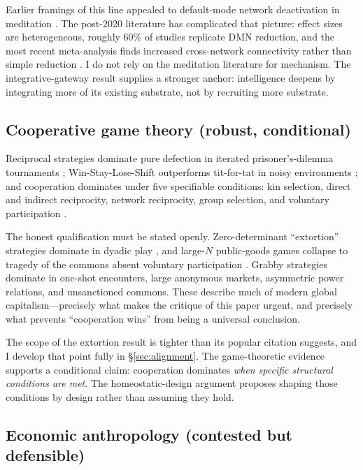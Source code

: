 \documentclass[11pt,a4paper,twocolumn]{article}
\begin{document}
Earlier framings of this line appealed to default-mode network
deactivation in meditation \citep{brewer2011,garrison2015}. The
post-2020 literature has complicated that picture: effect sizes are
heterogeneous, roughly 60\% of studies replicate DMN reduction, and
the most recent meta-analysis finds increased cross-network
connectivity rather than simple reduction
\citep{vandam2018,rahrig2022,ganesan2022}. I do not rely on the
meditation literature for mechanism. The integrative-gateway result
supplies a stronger anchor: intelligence deepens by integrating more
of its existing substrate, not by recruiting more substrate.

\subsection{Cooperative game theory (robust, conditional)}

Reciprocal strategies dominate pure defection in iterated
prisoner's-dilemma tournaments \citep{axelrod1984}; Win-Stay-Lose-Shift
outperforms tit-for-tat in noisy environments \citep{nowak1993}; and
cooperation dominates under five specifiable conditions: kin
selection, direct and indirect reciprocity, network reciprocity, group
selection, and voluntary participation \citep{nowak2006}.

The honest qualification must be stated openly. Zero-determinant
``extortion'' strategies dominate in dyadic play \citep{press2012}, and
large-$N$ public-goods games collapse to tragedy of the commons absent
voluntary participation \citep{hauert2002}. Grabby strategies dominate
in one-shot encounters, large anonymous markets, asymmetric power
relations, and unsanctioned commons. These describe much of modern
global capitalism---precisely what makes the critique of this paper
urgent, and precisely what prevents ``cooperation wins'' from being a
universal conclusion.

The scope of the extortion result is tighter than its popular
citation suggests, and I develop that point fully in
\S\ref{sec:alignment}. The game-theoretic evidence supports a
conditional claim: cooperation dominates \emph{when specific
structural conditions are met}. The homeostatic-design argument
proposes shaping those conditions by design rather than assuming they
hold.

\subsection{Economic anthropology (contested but defensible)}
\end{document}
